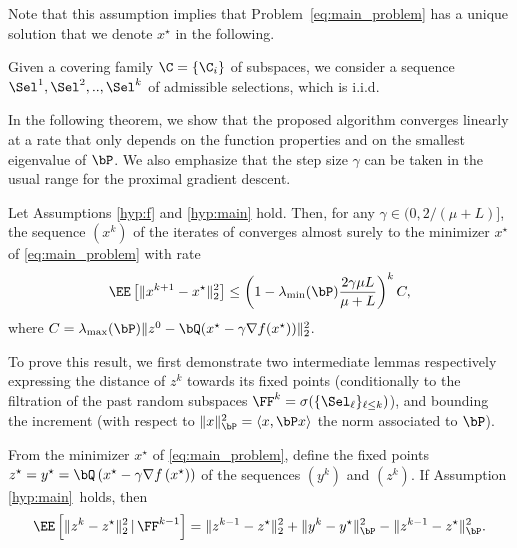 Note that this assumption implies that Problem~\eqref{eq:main_problem} has a unique solution that we denote $x^\star$ in the following.


\begin{assumption}\label{hyp:main}
Given a covering family $\C=\{ \C_i \}$ of subspaces, we consider a sequence $\Sel^1,\Sel^2,..,\Sel^k$ of admissible selections, which is i.i.d.
\end{assumption}

In the following theorem, we show that the proposed algorithm converges linearly at a rate that only depends on the function properties and on the smallest eigenvalue of $\bP$.
We also emphasize that the step size $\gamma$ can be taken in the usual range for the proximal gradient descent.  


\begin{theorem}\label{th:conv_nondis}
Let Assumptions \ref{hyp:f} and  \ref{hyp:main} hold. Then, for any $\gamma\in(0,2/(\mu+L)]$, the sequence $(x^k)$ of the iterates of \algo converges almost surely to the minimizer  $x^\star$  of \eqref{eq:main_problem} with rate
$$
\EE\left[\|x^{k+1} - x^\star\|_2^2\right] \leq \left(1 - \lambda_{\min}(\bP) \frac{2\gamma\mu L}{\mu + L} \right)^k C,
$$
where $C = \lambda_{\max}(\bP)\|z^0 - \bQ(x^\star - \gamma\nabla f(x^\star))\|_2^2$.
\end{theorem}

To prove this result, we first demonstrate two intermediate lemmas respectively expressing the distance of $z^k$ towards its fixed points (conditionally to the filtration of the past random subspaces $\FF^k = \sigma( \{\Sel_\ell\}_{\ell\leq k} )$), and bounding the increment (with respect to $\| x \|_{\bP}^2 = \langle x , \bP x \rangle $ the norm associated to $\bP$).


\begin{lemma}\label{lm:removing_exp}
From the minimizer  $x^\star$  of \eqref{eq:main_problem}, define the fixed points $z^\star = y^\star = \bQ\left(x^\star - \gamma\nabla f\left(x^\star\right)\right)$ of the sequences $(y^k)$ and $(z^k)$.  If Assumption \ref{hyp:main}~holds, then 
    $$
    \EE\left[\|z^{k} - z^\star\|_2^2\,|\,\FF^{k-1}\right] = \|z^{k-1}-z^\star\|_2^2 + \|y^{k}-y^\star\|_{\bP}^2 -  \|z^{k-1}-z^\star\|_{\bP}^2.
    $$
\end{lemma}

